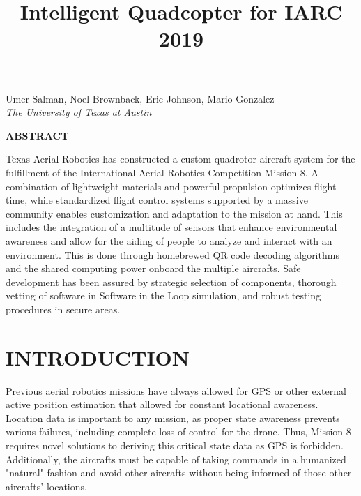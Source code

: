 \documentclass[12pt,letterpaper]{article}
\title{Intelligent Quadcopter for IARC 2019}
\newenvironment{nscenter}
 {\parskip=0pt\par\nopagebreak\centering}
 {\par\noindent\ignorespacesafterend}
\newcommand{\affiliatedauthor}[2]{
\begin{nscenter}
	#1 \\ \textit{#2}
\end{nscenter}
}
\renewcommand{\abstractname}{ABSTRACT}
\renewenvironment{abstract}
 {\vspace{-0.5ex}
	\small
	\begin{center}
		\bfseries \abstractname\vspace{-4ex}\vspace{0pt}
	\end{center}
	\list{}{
		\setlength{\leftmargin}{0.5in}
		\setlength{\rightmargin}{\leftmargin}
	}
	\item\relax}
 {\endlist}
\begin{document}
\begin{center}
	\textbf{\LARGE{\thetitle}}
\end{center}

\affiliatedauthor{Umer Salman, Noel Brownback, Eric Johnson, Mario Gonzalez}{The University of Texas at Austin}


\begin{abstract}
	Texas Aerial Robotics has constructed a custom quadrotor aircraft system for the fulfillment of the International Aerial Robotics Competition Mission 8. A combination of lightweight materials and powerful propulsion optimizes flight time, while standardized flight control systems supported by a massive community enables customization and adaptation to the mission at hand. This includes the integration of a multitude of sensors that enhance environmental awareness and allow for the aiding of people to analyze and interact with an environment. This is done through homebrewed QR code decoding algorithms and the shared computing power onboard the multiple aircrafts. Safe development has been assured by strategic selection of components, thorough vetting of software in Software in the Loop simulation, and robust testing procedures in secure areas.
\end{abstract}


\section*{INTRODUCTION}
	Previous aerial robotics missions have always allowed for GPS or other external active position estimation  that allowed for constant locational awareness. Location data is important to any mission, as proper state awareness prevents various failures, including complete loss of control for the drone. Thus, Mission 8 requires novel solutions to deriving this critical state data as GPS is forbidden. Additionally, the aircrafts must be capable of taking commands in a humanized "natural" fashion and avoid other aircrafts without being informed of those other aircrafts' locations.
\end{document}

